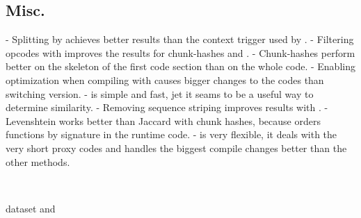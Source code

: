 \documentclass[../main.tex]{subfiles}
\begin{document}
\subsection{Misc.}

\hyp{
  Splitting by  achieves better results than the context trigger used by .
}
\hyp{
  Filtering opcodes with  improves the results for chunk-hashes and .
}
\hyp{
  Chunk-hashes perform better on the skeleton of the first code section than on the whole code.
}
\hyp{
  Enabling optimization when compiling with  causes bigger changes to the codes than switching  version.
}
\hyp{
   is simple and fast, jet it seams to be a useful way to determine similarity.
}
\hyp{
  Removing sequence striping improves results with .
}
\hyp{
  Levenshtein works better than Jaccard with chunk hashes, because  orders functions by signature in the runtime code.
}
\hyp{
   is very flexible, it deals with the very short proxy codes and handles the biggest compile changes better than the other methods.
}

\begin{table}[ht!]
  \centering
  \scriptsize %
  \parbox{5em}{~}
  \caption{ dataset  and }
  \label{tbl:wallet_sep}
\end{table}
\end{document}
